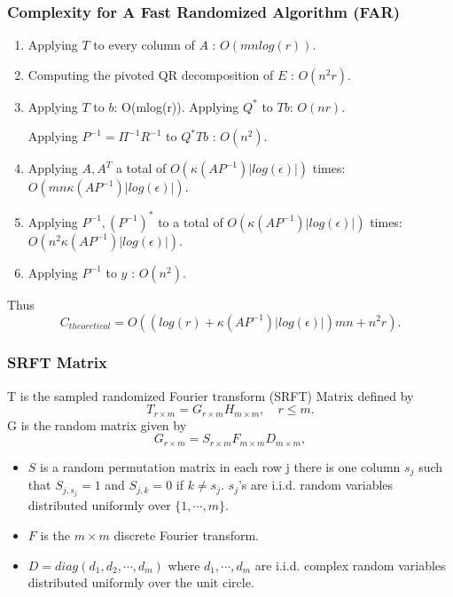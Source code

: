 \subsubsection{Complexity for A Fast Randomized Algorithm (FAR)}
	\begin{enumerate}
		\item Applying $T$ to every column of $A$ : $O(mnlog(r))$.  \\
		\item Computing the pivoted QR decomposition of $E$ : $O(n^2r) . $ \\
		\item Applying $T$ to $b$: O(mlog(r)). Applying $Q^*$ to $Tb$: $O(nr)$.
		
		Applying $P^{-1} = \Pi^{-1} R^{-1}$ to $Q^* Tb$ : $O(n^2). $ \\
		\item Applying $A,A^T$ a total of $O(\kappa(AP^{-1}) |log(\epsilon)|)$ times: {\color{red}$O(mn\kappa(AP^{-1}) |log(\epsilon)|).$} \\
		\item Applying $P^{-1},(P^{-1})^*$ to a total of $O(\kappa(AP^{-1}) |log(\epsilon)|)$ times: {\color{red}$O(n^2 \kappa(AP^{-1}) |log(\epsilon)|).$} \\
		\item Applying $P^{-1}$ to $y$ : $O(n^2). $
	\end{enumerate}
Thus
{\color{red}
	$$
	C_{theoretical} = O((log(r) + \kappa(AP^{-1}) |log(\epsilon)|) mn +n^2r).
	$$}




\subsubsection{SRFT Matrix}
T is the sampled randomized Fourier transform (SRFT) Matrix defined by
$$T _{r \times m} = G_{r \times m} H_{m \times m}, \quad  r \leq m. $$
G is the random matrix given by
$$ G_{r \times m} = S_{r \times m} F_{m \times m} D_{m \times m}, $$



\begin{itemize}
	\item $S$ is a random permutation matrix in each row j there is one column $s_j$ such that $S_{j,s_j} = 1$ and $S_{j,k} =0$ if $k \neq s_j$. $s_j$'s are i.i.d. random variables distributed uniformly over $\{ 1,\cdots,m\}. $ \\
	\item $F$ is the $m \times m$ discrete Fourier transform. \\
	\item $D = diag(d_1,d_2,\cdots,d_m)$
	where $d_1,\cdots,d_m$ are i.i.d. complex random variables distributed uniformly over the unit circle.
\end{itemize}



